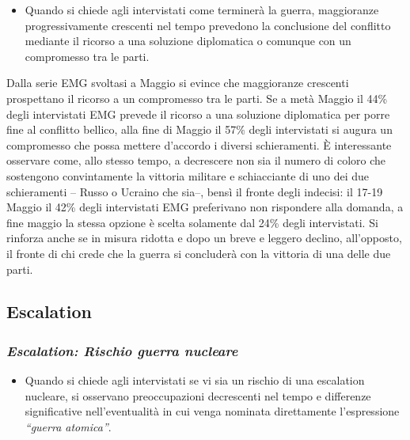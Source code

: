 \documentclass[
]{book}
\providecommand{\tightlist}{%
  \setlength{\itemsep}{0pt}\setlength{\parskip}{0pt}}
\begin{document}
\begin{itemize}
\tightlist
\item
  Quando si chiede agli intervistati come terminerà la guerra, maggioranze progressivamente crescenti nel tempo prevedono la conclusione del conflitto mediante il ricorso a una soluzione diplomatica o comunque con un compromesso tra le parti.
\end{itemize}

Dalla serie EMG svoltasi a Maggio si evince che maggioranze crescenti prospettano il ricorso a un compromesso tra le parti. Se a metà Maggio il 44\% degli intervistati EMG prevede il ricorso a una soluzione diplomatica per porre fine al conflitto bellico, alla fine di Maggio il 57\% degli intervistati si augura un compromesso che possa mettere d'accordo i diversi schieramenti. È interessante osservare come, allo stesso tempo, a decrescere non sia il numero di coloro che sostengono convintamente la vittoria militare e schiacciante di uno dei due schieramenti -- Russo o Ucraino che sia--, bensì il fronte degli indecisi: il 17-19 Maggio il 42\% degli intervistati EMG preferivano non rispondere alla domanda, a fine maggio la stessa opzione è scelta solamente dal 24\% degli intervistati. Si rinforza anche se in misura ridotta e dopo un breve e leggero declino, all'opposto, il fronte di chi crede che la guerra si concluderà con la vittoria di una delle due parti.

\hypertarget{escalation}{%
\subsection{Escalation}\label{escalation}}

\hypertarget{escalation-rischio-guerra-nucleare}{%
\subsubsection{\texorpdfstring{\emph{Escalation: Rischio guerra nucleare}}{Escalation: Rischio guerra nucleare}}\label{escalation-rischio-guerra-nucleare}}

\begin{itemize}
\tightlist
\item
  Quando si chiede agli intervistati se vi sia un rischio di una escalation nucleare, si osservano preoccupazioni decrescenti nel tempo e differenze significative nell'eventualità in cui venga nominata direttamente l'espressione \emph{``guerra atomica''}.
\end{itemize}
\end{document}
